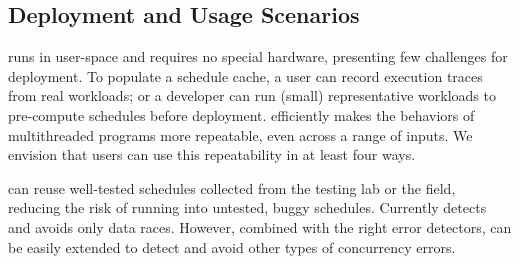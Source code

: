 


\subsection{Deployment and Usage Scenarios} \label{sec:deploy}

\peregrine runs in user-space and requires no special hardware, presenting few
challenges for deployment.  To populate a schedule cache, a user can
record execution traces from real workloads;
or a developer can run (small) representative workloads
to pre-compute schedules before deployment.  \peregrine
efficiently makes the behaviors of multithreaded programs more repeatable,
even across a range of inputs.  We envision that users can use this repeatability in
at least four ways.

 \peregrine can reuse well-tested schedules
collected from the testing lab or the field, reducing the risk of running
into untested, buggy schedules.  
Currently \peregrine detects and avoids only data races.  However, combined with
the right error detectors, \peregrine can be easily extended to detect and
avoid other types of concurrency errors.

